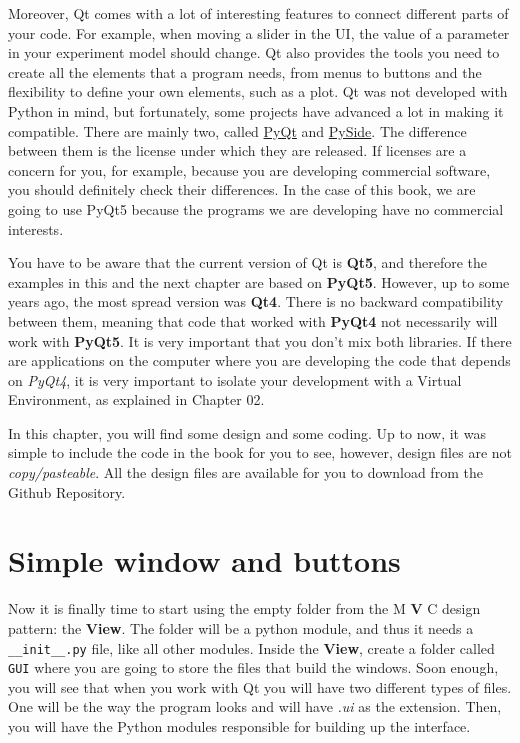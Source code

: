 Moreover, Qt comes with a lot of interesting features to connect
different parts of your code. For example, when moving a slider in the
{UI}, the value of a parameter in your experiment model should change.
Qt also provides the tools you need to create all the elements that a
program needs, from menus to buttons and the flexibility to define your
own elements, such as a plot. Qt was not developed with Python in mind,
but fortunately, some projects have advanced a lot in making it
compatible. There are mainly two, called
\href{https://riverbankcomputing.com/software/pyqt/intro}{PyQt} and
\href{https://wiki.qt.io/PySide}{PySide}. The difference between them is
the license under which they are released. If licenses are a concern for
you, for example, because you are developing commercial software, you
should definitely check their differences. In the case of this book, we
are going to use PyQt5 because the programs we are developing have no
commercial interests.

You have to be aware that the current version of Qt is \textbf{Qt5}, and
therefore the examples in this and the next chapter are based on
\textbf{PyQt5}. However, up to some years ago, the most spread version
was \textbf{Qt4}. There is no backward compatibility between them,
meaning that code that worked with \textbf{PyQt4} not necessarily will
work with \textbf{PyQt5}. It is very important that you don't mix both
libraries. If there are applications on the computer where you are
developing the code that depends on \emph{PyQt4}, it is very important
to isolate your development with a Virtual Environment, as explained in
Chapter 02.

In this chapter, you will find some design and some coding. Up to now,
it was simple to include the code in the book for you to see, however,
design files are not \emph{copy/pasteable}. All the design files are
available for you to download from the Github Repository.

\hypertarget{simple-window-and-buttons}{}
\section{Simple window and buttons}\label{simple-window-andbuttons}

Now it is finally time to start using the empty folder from the M
\textbf{V} C design pattern: the \textbf{View}. The folder will be a
python module, and thus it needs a \texttt{__init__.py} file, like
all other modules. Inside the \textbf{View}, create a folder called
\texttt{GUI} where you are going to store the files that build the
windows. Soon enough, you will see that when you work with Qt you will
have two different types of files. One will be the way the program looks
and will have \emph{.ui} as the extension. Then, you will have the
Python modules responsible for building up the interface.

